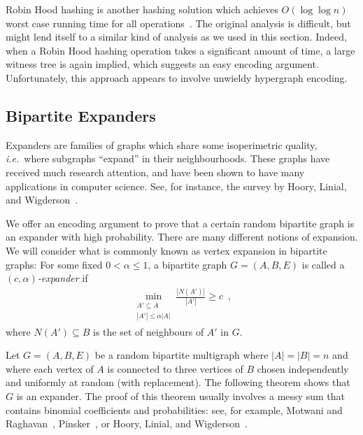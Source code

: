 \documentclass{patmorin}
\begin{document}
\begin{rem}
  Robin Hood hashing is another hashing solution which achieves
  $O(\log \log n)$ worst case running time for all
  operations~\cite{devroye:robin}. The original analysis is difficult,
  but might lend itself to a similar kind of analysis as we used in
  this section. Indeed, when a Robin Hood hashing operation takes a
  significant amount of time, a large witness tree is again implied,
  which suggests an easy encoding argument. Unfortunately, this
  approach appears to involve unwieldy hypergraph encoding.
\end{rem}


\subsection{Bipartite Expanders}

Expanders are families of graphs which share some isoperimetric
quality, \emph{i.e.}~where subgraphs ``expand'' in their
neighbourhoods. These graphs have received much research attention,
and have been shown to have many applications in computer
science. See, for instance, the survey by Hoory, Linial, and
Wigderson~\cite{hoory.linial.ea:expander}.

We offer an encoding argument to prove that a certain random bipartite
graph is an expander with high probability. There are many different
notions of expansion. We will consider what is commonly known as
vertex expansion in bipartite graphs: For some fixed $0 < \alpha \leq
1$, a bipartite graph $G = (A, B, E)$ is called a \emph{$(c,
  \alpha)$-expander} if
\begin{align*}
  \min_{\substack{{A' \subseteq A}\\{|A'| \leq \alpha |A|}}} \frac{|N(A')|}{|A'|} \geq c \enspace ,
\end{align*}
where $N(A') \subseteq B$ is the set of neighbours of $A'$ in $G$.

Let $G = (A, B, E)$ be a random bipartite multigraph where $|A| = |B|
= n$ and where each vertex of $A$ is connected to three vertices of
$B$ chosen independently and uniformly at random (with
replacement). The following theorem shows that $G$ is an expander.
The proof of this theorem usually involves a messy sum that contains
binomial coefficients and probabilities: see, for example, Motwani and
Raghavan~\cite[Theorem~5.3]{motwani.raghavan:randomized},
Pinsker~\cite[Lemma~1]{pinsker:on}, or Hoory, Linial, and
Wigderson~\cite[Lemma~1.9]{hoory.linial.ea:expander}.
\end{document}
